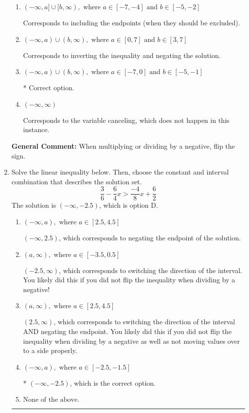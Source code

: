 \documentclass{extbook}[14pt]
\newcommand{\litem}[1]{\item #1

\rule{\textwidth}{0.4pt}}
\begin{document}
\begin{enumerate}
{\begin{enumerate}[label=\Alph*.]
Corresponds to including the endpoints AND negating.
\item \( (-\infty, a] \cup [b, \infty), \text{ where } a \in [-7, -4] \text{ and } b \in [-5, -2] \)

Corresponds to including the endpoints (when they should be excluded).
\item \( (-\infty, a) \cup (b, \infty), \text{ where } a \in [0, 7] \text{ and } b \in [3, 7] \)

Corresponds to inverting the inequality and negating the solution.
\item \( (-\infty, a) \cup (b, \infty), \text{ where } a \in [-7, 0] \text{ and } b \in [-5, -1] \)

 * Correct option.
\item \( (-\infty, \infty) \)

Corresponds to the variable canceling, which does not happen in this instance.
\end{enumerate}

\textbf{General Comment:} When multiplying or dividing by a negative, flip the sign.
}
\litem{
Solve the linear inequality below. Then, choose the constant and interval combination that describes the solution set.
\[ \frac{3}{6} - \frac{6}{4} x > \frac{-4}{8} x + \frac{6}{2} \]
The solution is \( (-\infty, -2.5) \), which is option D.\begin{enumerate}[label=\Alph*.]
\item \( (-\infty, a), \text{ where } a \in [2.5, 4.5] \)

 $(-\infty, 2.5)$, which corresponds to negating the endpoint of the solution.
\item \( (a, \infty), \text{ where } a \in [-3.5, 0.5] \)

 $(-2.5, \infty)$, which corresponds to switching the direction of the interval. You likely did this if you did not flip the inequality when dividing by a negative!
\item \( (a, \infty), \text{ where } a \in [2.5, 4.5] \)

 $(2.5, \infty)$, which corresponds to switching the direction of the interval AND negating the endpoint. You likely did this if you did not flip the inequality when dividing by a negative as well as not moving values over to a side properly.
\item \( (-\infty, a), \text{ where } a \in [-2.5, -1.5] \)

* $(-\infty, -2.5)$, which is the correct option.
\item \( \text{None of the above}. \)


\end{enumerate}}
\end{enumerate}
\end{document}
